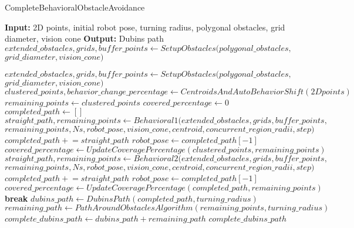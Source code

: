 \begin{algorithm}[H]
    \caption{CompleteBehavioralObstacleAvoidance}
    \begin{algorithmic}[1]
        \Statex \textbf{Input:} 2D points, initial robot pose, turning radius, polygonal obstacles, grid diameter, vision cone
        \Statex \textbf{Output:} Dubins path
        \newline
        \State $extended\_obstacles, grids, buffer\_points \gets SetupObstacles(polygonal\_obstacles,$
        \Statex \hspace{9cm} $grid\_diameter, vision\_cone)$

        \State $extended\_obstacles, grids, buffer\_points \gets SetupObstacles(polygonal\_obstacles, $
        \Statex \hspace{9cm} $grid\_diameter, vision\_cone)$
        \State $clustered\_points, behavior\_change\_percentage \gets CentroidsAndAutoBehaviorShi f t(2Dpoints)$
        \State $remaining\_points \gets clustered\_points$
        \State $covered\_percentage \gets 0$
        \State $completed\_path \gets []$
                \State $straight\_path, remaining\_points \gets Behavioral1(extended\_obstacles, grids, buffer\_points,$
                \Statex \hspace{\algorithmicindent} $remaining\_points, Ns, robot\_pose, vision\_cone, centroid, concurrent\_region\_radii, step)$
                \State $completed\_path \mathrel{+}= straight\_path$
                \State $robot\_pose \gets completed\_path[-1]$
                \State $covered\_percentage \gets UpdateCoveragePercentage(clustered\_points, remaining\_points)$
            \Else
                \State $straight\_path, remaining\_points \gets Behavioral2(extended\_obstacles, grids, buffer\_points,$
                \Statex \hspace{\algorithmicindent} $remaining\_points, Ns, robot\_pose, vision\_cone, centroid, concurrent\_region\_radii, step)$
                \State $completed\_path \mathrel{+}= straight\_path$
                \State $robot\_pose \gets completed\_path[-1]$
                \State $covered\_percentage \gets UpdateCoveragePercentage(completed\_path, remaining\_points)$
            \EndIf
                \State \textbf{break}
            \EndIf
        \EndWhile
        \State $dubins\_path \gets DubinsPath(completed\_path, turning\_radius)$
        \State $remaining\_path \gets PathAroundObstaclesAlgorithm(remaining\_points, turning\_radius)$
        \State $complete\_dubins\_path \gets dubins\_path + remaining\_path$
        \State \Return $complete\_dubins\_path$
    \end{algorithmic}
\end{algorithm}



